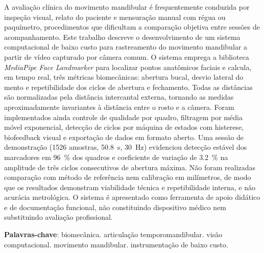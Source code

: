 \documentclass[
    article,
    11pt,
    oneside,
    a4paper,
    english,
    brazil
]{abntex2}
\begin{document}
\frenchspacing

\maketitle

\begin{resumoumacoluna}
A avaliação clínica do movimento mandibular é frequentemente conduzida por
inspeção visual, relato do paciente e mensuração manual com régua ou
paquímetro, procedimentos que dificultam a comparação objetiva entre
sessões de acompanhamento. Este trabalho descreve o desenvolvimento de um
sistema computacional de baixo custo para rastreamento do movimento
mandibular a partir de vídeo capturado por câmera comum. O sistema emprega
a biblioteca \textit{MediaPipe Face Landmarker} para localizar pontos
anatômicos faciais e calcula, em tempo real, três métricas
biomecânicas: abertura bucal, desvio lateral do mento e repetibilidade dos
ciclos de abertura e fechamento. Todas as distâncias são normalizadas pela
distância intercantal externa, tornando as medidas aproximadamente
invariantes à distância entre o rosto e a câmera. Foram implementados ainda
controle de qualidade por quadro, filtragem por média móvel exponencial,
detecção de ciclos por máquina de estados com histerese, biofeedback visual
e exportação de dados em formato aberto. Uma sessão de demonstração
(\num{1526} amostras, \SI{50,8}{\second}, \SI{30}{\hertz}) evidenciou
detecção estável dos marcadores em \SI{96}{\percent} dos quadros e
coeficiente de variação de \SI{3,2}{\percent} na amplitude de três ciclos
consecutivos de abertura máxima. Não foram realizadas comparação com método
de referência nem calibração em milímetros, de modo que os resultados
demonstram viabilidade técnica e repetibilidade interna, e não acurácia
metrológica. O sistema é apresentado como ferramenta de apoio didático e de
documentação funcional, não constituindo dispositivo médico nem substituindo
avaliação profissional.

\vspace{\onelineskip}

\noindent
\textbf{Palavras-chave}: biomecânica. articulação temporomandibular. visão
computacional. movimento mandibular. instrumentação de baixo custo.
\end{resumoumacoluna}
\end{document}
